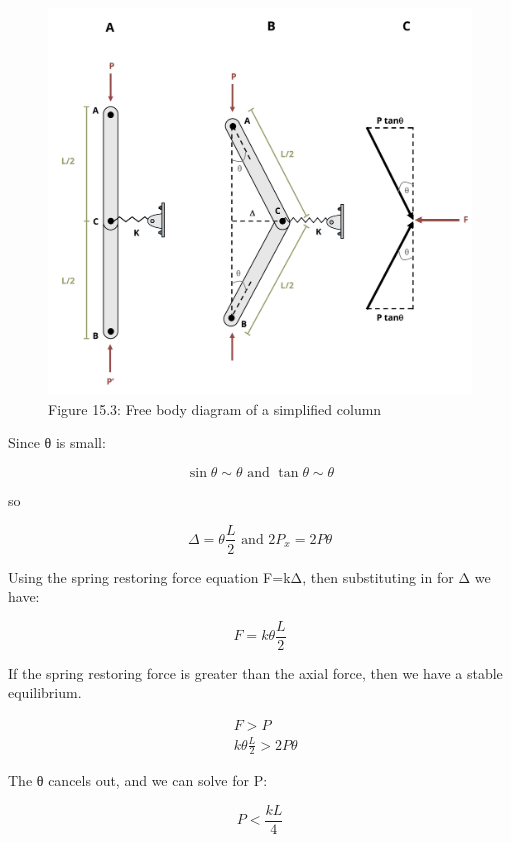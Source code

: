 \documentclass[
  letterpaper,
  DIV=11,
  numbers=noendperiod]{scrreprt}
\begin{document}
\begin{figure}[H]

{\centering \includegraphics{images/CH15s PNGs/figure 15.3.png}

}

\caption{Figure 15.3: Free body diagram of a simplified column}

\end{figure}%

Since θ is small:

\[
\sin \theta \sim \theta \text { and } \tan \theta \sim \theta
\]

so

\[
\Delta=\theta \frac{L}{2} \text { and } 2 P_x=2 P \theta
\]

Using the spring restoring force equation F=kΔ, then substituting in for
Δ we have:

\[
F=k \theta \frac{L}{2}
\]

If the spring restoring force is greater than the axial force, then we
have a stable equilibrium.

\[
\begin{aligned}
& F>P \\
& k \theta \frac{L}{2}>2 P \theta
\end{aligned}
\]

The θ cancels out, and we can solve for P:

\[
P<\frac{k L}{4}
\]
\end{document}

